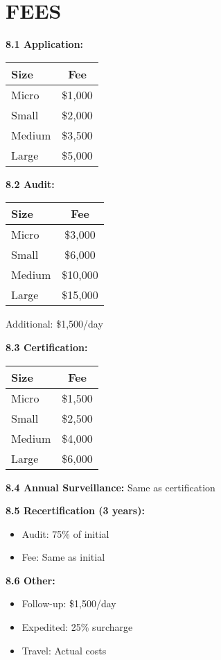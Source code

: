 \documentclass[11pt,a4paper]{article}
\begin{document}
\section{FEES}

\textbf{8.1 Application:}

\begin{tabular}{|l|c|}
\hline
Size & Fee \\
\hline
Micro & \$1,000 \\
Small & \$2,000 \\
Medium & \$3,500 \\
Large & \$5,000 \\
\hline
\end{tabular}

\textbf{8.2 Audit:}

\begin{tabular}{|l|c|}
\hline
Size & Fee \\
\hline
Micro & \$3,000 \\
Small & \$6,000 \\
Medium & \$10,000 \\
Large & \$15,000 \\
\hline
\end{tabular}

Additional: \$1,500/day

\textbf{8.3 Certification:}

\begin{tabular}{|l|c|}
\hline
Size & Fee \\
\hline
Micro & \$1,500 \\
Small & \$2,500 \\
Medium & \$4,000 \\
Large & \$6,000 \\
\hline
\end{tabular}

\textbf{8.4 Annual Surveillance:} Same as certification

\textbf{8.5 Recertification (3 years):}
\begin{itemize}
\item Audit: 75\% of initial
\item Fee: Same as initial
\end{itemize}

\textbf{8.6 Other:}
\begin{itemize}
\item Follow-up: \$1,500/day
\item Expedited: 25\% surcharge
\item Travel: Actual costs
\end{itemize}
\end{document}
